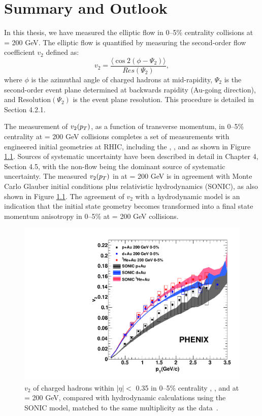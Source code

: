 \chapter{Summary and Outlook}
In this thesis, we have measured the elliptic flow in 0--5\% centrality \pau collisions at \sqsn = 200 GeV. The elliptic flow is quantified by measuring the second-order flow coefficient $v_2$ defined as:
\begin{equation}
v_2 = \frac{\langle\cos 2(\phi-\Psi_2) \rangle}{ Res(\Psi_2)},
\end{equation}
where $\phi$ is the azimuthal angle of charged hadrons at mid-rapidity, $\Psi_2$ is the second-order event plane determined at backwards rapidity (Au-going direction), and Resolution$(\Psi_2)$ is the event plane resolution. This procedure is detailed in Section 4.2.1.

The measurement of $v_2(\mbox{$p_T$})$, as a function of transverse momentum, in 0--5\% centrality \pau at \sqsn = 200 GeV collisions completes a set of measurements with engineered initial geometries at RHIC, including the \pau, \dau, and \hau as shown in Figure \ref{fig:all_system_hydro_6}. Sources of systematic uncertainty have been described in detail in Chapter 4, Section 4.5, with the non-flow being the dominant source of systematic uncertainty. The measured $v_2(\mbox{$p_T$})$ in \pau at \sqsn = 200 GeV is in agreement with Monte Carlo Glauber initial conditions plus relativistic hydrodynamics (SONIC), as also shown in Figure \ref{fig:all_system_hydro_6}. The agreement of $v_2$ with a hydrodynamic model is an indication that the initial state geometry becomes transformed into a final state momentum anisotropy in 0--5\% \pau at \sqsn = 200 GeV collisions. 

\begin{figure}[!ht]
\begin{center}
\includegraphics[width=0.5\linewidth]{figs/three_system_comparison_result.pdf}
\caption{$v_2$ of charged hadrons within $|\eta| <$ 0.35 in 0--5\% centrality \pau, \dau, and \hau at \sqsn = 200 GeV, compared with hydrodynamic calculations using the SONIC model, matched to the same multiplicity as the data~\cite{Habich:2014jna}.}
\label{fig:all_system_hydro_6}
\end{center}
\end{figure}

